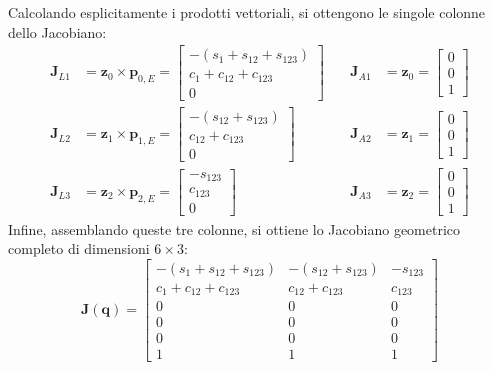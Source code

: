 \documentclass[11pt, a4paper]{report}
\begin{document}
Calcolando esplicitamente i prodotti vettoriali, si ottengono le singole colonne dello Jacobiano:
\[
\begin{alignedat}{2}
    \bm{J}_{L1} &= \bm{z}_0 \times \bm{p}_{0,E} = \begin{bmatrix} -(s_1+s_{12}+s_{123}) \\ c_1+c_{12}+c_{123} \\ 0 \end{bmatrix} &\quad \bm{J}_{A1} &= \bm{z}_0 = \begin{bmatrix} 0 \\ 0 \\ 1 \end{bmatrix} \\
    \bm{J}_{L2} &= \bm{z}_1 \times \bm{p}_{1,E} = \begin{bmatrix} -(s_{12}+s_{123}) \\ c_{12}+c_{123} \\ 0 \end{bmatrix} &\quad \bm{J}_{A2} &= \bm{z}_1 = \begin{bmatrix} 0 \\ 0 \\ 1 \end{bmatrix} \\
    \bm{J}_{L3} &= \bm{z}_2 \times \bm{p}_{2,E} = \begin{bmatrix} -s_{123} \\ c_{123} \\ 0 \end{bmatrix} &\quad \bm{J}_{A3} &= \bm{z}_2 = \begin{bmatrix} 0 \\ 0 \\ 1 \end{bmatrix}
\end{alignedat}
\]
Infine, assemblando queste tre colonne, si ottiene lo Jacobiano geometrico completo di dimensioni $6 \times 3$:
\[
    \bm{J}(\bm{q}) =
    \begin{bmatrix}
        -(s_{1} + s_{12} + s_{123}) & -(s_{12} + s_{123}) & -s_{123} \\
        c_{1} + c_{12} + c_{123} & c_{12} + c_{123} & c_{123} \\
        0 & 0 & 0 \\
        \hline
        0 & 0 & 0 \\
        0 & 0 & 0 \\
        1 & 1 & 1
    \end{bmatrix}
\]
\end{document}
